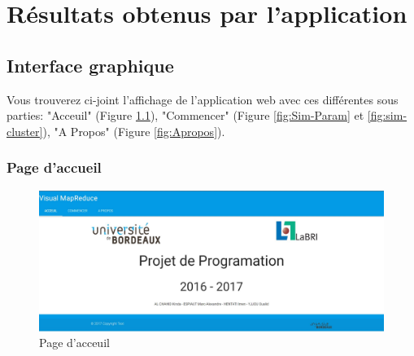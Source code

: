 \chapter{Résultats obtenus par l'application}

\section{Interface graphique}

Vous trouverez ci-joint l'affichage de l'application web avec ces différentes sous parties: "Acceuil" (Figure \ref{fig:PageAcceuil}), "Commencer" (Figure \ref{fig:Sim-Param} et \ref{fig:sim-cluster}), "A Propos" (Figure \ref{fig:Apropos}).
\subsection{Page d'accueil}

\begin{figure}[H]
  \centering
    \includegraphics[width=1\textwidth]{images/resultat_acceuil.jpg}
        \caption{Page d'acceuil}
        \label{fig:PageAcceuil}
\end{figure}
